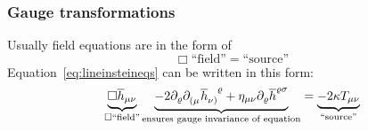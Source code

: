 \subsubsection{Gauge transformations}
Usually field equations are in the form of
\begin{equation}
    \Box \text{``field''} = \text{``source''}
\end{equation}
Equation~\eqref{eq:lineinsteineqs} can be written in this form:
\begin{equation}
    \underbrace{\Box \overline{h}_{\mu\nu}}_{\Box\text{``field''}}
    \underbrace{- 2 \partial_\varrho \tensor{\partial}{_(_\mu} \tensor{\overline{h}}{_\nu_)^\varrho}
    + \eta_{\mu\nu}\partial_\varrho \overline{h}^{\varrho\sigma}}_{\text{ensures gauge invariance of equation}}
    = \underbrace{-2\kappa T_{\mu\nu}}_{\text{``source''}}
\end{equation}


